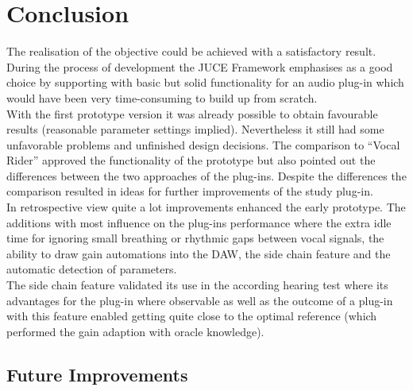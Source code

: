 \chapter{Conclusion}
\label{chapter:conclusion}

The realisation of the objective could be achieved with a satisfactory result. During the process of development the JUCE Framework emphasises as a good choice by supporting with basic but solid functionality for an audio plug-in which would have been very time-consuming to build up from scratch.\\
With the first prototype version it was already possible to obtain favourable results (reasonable parameter settings implied). Nevertheless it still had some unfavorable problems and unfinished design decisions. The comparison to “Vocal Rider” approved the functionality of the prototype but also pointed out the differences between the two approaches of the plug-ins. Despite the differences the comparison resulted in ideas for further improvements of the study plug-in.\\
In retrospective view quite a lot improvements enhanced the early prototype. The additions with most influence on the plug-ins performance where the extra idle time for ignoring small breathing or rhythmic gaps between vocal signals, the ability to draw gain automations into the DAW, the side chain feature and the automatic detection of parameters.\\
The side chain feature validated its use in the according hearing test where its advantages for the plug-in where observable as well as the outcome of a plug-in with this feature enabled getting quite close to the optimal reference (which performed the gain adaption with oracle knowledge).\\

\section{Future Improvements}

